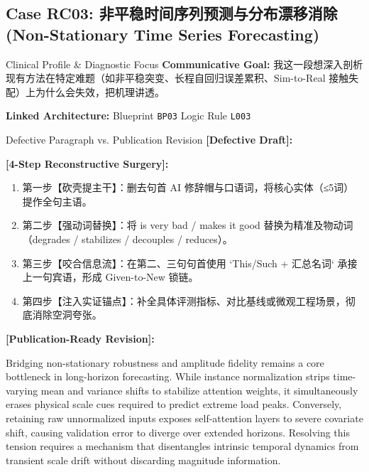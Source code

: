 \subsection{Case RC03: 非平稳时间序列预测与分布漂移消除 (Non-Stationary Time Series Forecasting)}\label{case:RC03}
\begin{ConceptBox}{Clinical Profile \& Diagnostic Focus}
\textbf{Communicative Goal:} 我这一段想深入剖析现有方法在特定难题（如非平稳突变、长程自回归误差累积、Sim-to-Real 接触失配）上为什么会失效，把机理讲透。\par
\textbf{Linked Architecture:} Blueprint \texttt{BP03} \enspace\textbar\enspace Logic Rule \texttt{L003}
\end{ConceptBox}
\begin{ExampleBox}{Defective Paragraph vs. Publication Revision}
\textbf{\color{TargetHighlight}[Defective Draft]:}\par
{}\par\vspace{6pt}
\textbf{\color{AcadForest}[4-Step Reconstructive Surgery]:}
\begin{enumerate}[label=\textbf{\color{AcadNavy}Step \arabic*:}, leftmargin=2em]
  \item 第一步【砍壳提主干】：删去句首 AI 修辞帽与口语词，将核心实体（≤5词）提作全句主语。
  \item 第二步【强动词替换】：将 is very bad / makes it good 替换为精准及物动词（degrades / stabilizes / decouples / reduces）。
  \item 第三步【咬合信息流】：在第二、三句句首使用 `This/Such + 汇总名词` 承接上一句宾语，形成 Given-to-New 锁链。
  \item 第四步【注入实证锚点】：补全具体评测指标、对比基线或微观工程场景，彻底消除空洞夸张。
\end{enumerate}\vspace{4pt}
\textbf{\color{AcadNavy}[Publication-Ready Revision]:}\par
Bridging non-stationary robustness and amplitude fidelity remains a core bottleneck in long-horizon forecasting. While instance normalization strips time-varying mean and variance shifts to stabilize attention weights, it simultaneously erases physical scale cues required to predict extreme load peaks. Conversely, retaining raw unnormalized inputs exposes self-attention layers to severe covariate shift, causing validation error to diverge over extended horizons. Resolving this tension requires a mechanism that disentangles intrinsic temporal dynamics from transient scale drift without discarding magnitude information.
\end{ExampleBox}
